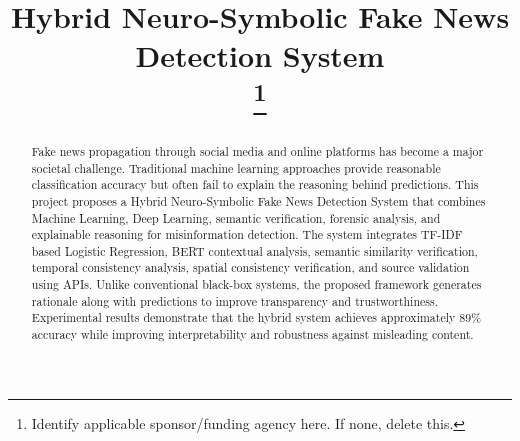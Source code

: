 \documentclass[conference]{IEEEtran}
\begin{document}
\title{Hybrid Neuro-Symbolic Fake News Detection System\\
\thanks{Identify applicable sponsor/funding agency here. If none, delete this.}
}

\author{
\and
{}
\and
{}
}

\maketitle

\begin{abstract}
Fake news propagation through social media and online platforms has become a major societal challenge. Traditional machine learning approaches provide reasonable classification accuracy but often fail to explain the reasoning behind predictions. This project proposes a Hybrid Neuro-Symbolic Fake News Detection System that combines Machine Learning, Deep Learning, semantic verification, forensic analysis, and explainable reasoning for misinformation detection. The system integrates TF-IDF based Logistic Regression, BERT contextual analysis, semantic similarity verification, temporal consistency analysis, spatial consistency verification, and source validation using APIs. Unlike conventional black-box systems, the proposed framework generates rationale along with predictions to improve transparency and trustworthiness. Experimental results demonstrate that the hybrid system achieves approximately 89\% accuracy while improving interpretability and robustness against misleading content.
\end{abstract}
\end{document}
